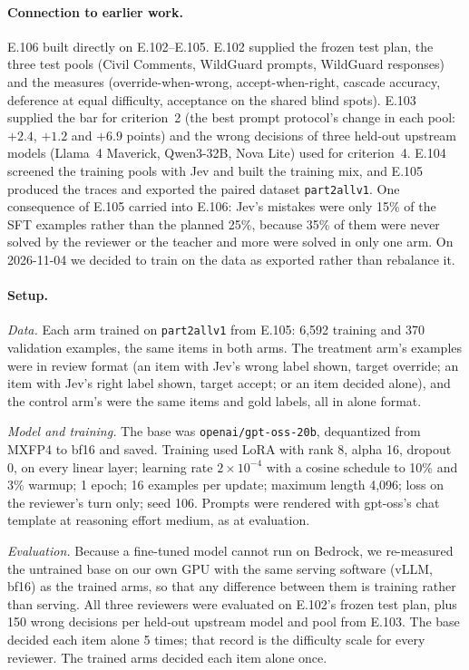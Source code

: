 \documentclass[11pt]{article}
\renewcommand{\_}{\origunderscore\allowbreak}
\begin{document}
\paragraph{Connection to earlier work.}
E.106 built directly on E.102--E.105. E.102 supplied the frozen test plan, the three test pools (Civil Comments, WildGuard prompts, WildGuard responses) and the measures (override-when-wrong, accept-when-right, cascade accuracy, deference at equal difficulty, acceptance on the shared blind spots). E.103 supplied the bar for criterion~2 (the best prompt protocol's change in each pool: $+2.4$, $+1.2$ and $+6.9$ points) and the wrong decisions of three held-out upstream models (Llama~4 Maverick, Qwen3-32B, Nova Lite) used for criterion~4. E.104 screened the training pools with Jev and built the training mix, and E.105 produced the traces and exported the paired dataset \texttt{part2\_all\_v1}. One consequence of E.105 carried into E.106: Jev's mistakes were only 15\% of the SFT examples rather than the planned 25\%, because 35\% of them were never solved by the reviewer or the teacher and more were solved in only one arm. On 2026-11-04 we decided to train on the data as exported rather than rebalance it.

\paragraph{Setup.}
\emph{Data.} Each arm trained on \texttt{part2\_all\_v1} from E.105: 6,592 training and 370 validation examples, the same items in both arms. The treatment arm's examples were in review format (an item with Jev's wrong label shown, target override; an item with Jev's right label shown, target accept; or an item decided alone), and the control arm's were the same items and gold labels, all in alone format.

\emph{Model and training.} The base was \texttt{openai/gpt-oss-20b}, dequantized from MXFP4 to bf16 and saved. Training used LoRA with rank 8, alpha 16, dropout 0, on every linear layer; learning rate $2\times10^{-4}$ with a cosine schedule to 10\% and 3\% warmup; 1 epoch; 16 examples per update; maximum length 4,096; loss on the reviewer's turn only; seed 106. Prompts were rendered with gpt-oss's chat template at reasoning effort medium, as at evaluation.

\emph{Evaluation.} Because a fine-tuned model cannot run on Bedrock, we re-measured the untrained base on our own GPU with the same serving software (vLLM, bf16) as the trained arms, so that any difference between them is training rather than serving. All three reviewers were evaluated on E.102's frozen test plan, plus 150 wrong decisions per held-out upstream model and pool from E.103. The base decided each item alone 5 times; that record is the difficulty scale for every reviewer. The trained arms decided each item alone once.
\end{document}
